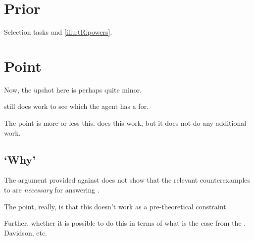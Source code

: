\section{Prior }
\label{sec:cscen1}

\begin{note}
  Selection tasks and \autoref{illu:tR:powers}.
\end{note}

\section{Point}
\label{sec:point}

\begin{note}
  Now, the upshot here is perhaps quite minor.

  \issueConstraint{} still does work to see which \ros{} the agent has a \wit{} for.

  The point is more-or-less this.
  \issueConstraint{} does this work, but it does not do any additional work.
\end{note}


\subsection{`Why'}
\label{sec:why}


\begin{note}
  The argument provided against \issueInclusion{} does not show that the relevant counterexamples to \issueInclusion{} are \emph{necessary} for answering \qWhy{}.

  The point, really, is that this doesn't work as a pre-theoretical constraint.


  Further, whether it is possible to do this in terms of what is the case from the \agpe{}.
  Davidson, etc.
\end{note}

